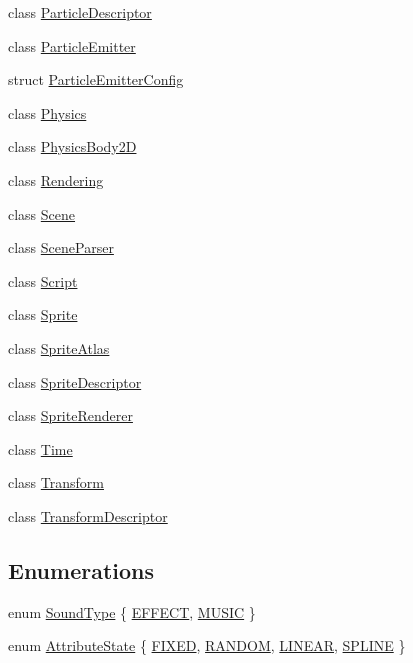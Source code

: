 \begin{DoxyCompactItemize}
class \hyperlink{class_mason_1_1_particle_descriptor}{Particle\+Descriptor}
\item 
class \hyperlink{class_mason_1_1_particle_emitter}{Particle\+Emitter}
\item 
struct \hyperlink{struct_mason_1_1_particle_emitter_config}{Particle\+Emitter\+Config}
\item 
class \hyperlink{class_mason_1_1_physics}{Physics}
\item 
class \hyperlink{class_mason_1_1_physics_body2_d}{Physics\+Body2D}
\item 
class \hyperlink{class_mason_1_1_rendering}{Rendering}
\item 
class \hyperlink{class_mason_1_1_scene}{Scene}
\item 
class \hyperlink{class_mason_1_1_scene_parser}{Scene\+Parser}
\item 
class \hyperlink{class_mason_1_1_script}{Script}
\item 
class \hyperlink{class_mason_1_1_sprite}{Sprite}
\item 
class \hyperlink{class_mason_1_1_sprite_atlas}{Sprite\+Atlas}
\item 
class \hyperlink{class_mason_1_1_sprite_descriptor}{Sprite\+Descriptor}
\item 
class \hyperlink{class_mason_1_1_sprite_renderer}{Sprite\+Renderer}
\item 
class \hyperlink{class_mason_1_1_time}{Time}
\item 
class \hyperlink{class_mason_1_1_transform}{Transform}
\item 
class \hyperlink{class_mason_1_1_transform_descriptor}{Transform\+Descriptor}
\end{DoxyCompactItemize}
\subsection*{Enumerations}
\begin{DoxyCompactItemize}
\item 
enum \hyperlink{namespace_mason_a158d651086d1ba1aacc4c37125b27657}{Sound\+Type} \{ \hyperlink{namespace_mason_a158d651086d1ba1aacc4c37125b27657a3ee843ce73fc06de504eb1480c65c82f}{E\+F\+F\+E\+CT}, 
\hyperlink{namespace_mason_a158d651086d1ba1aacc4c37125b27657aed96b5a2149aa99cd63db202531798a2}{M\+U\+S\+IC}
 \}
\item 
enum \hyperlink{namespace_mason_aefc2ce7d9295b57af46ab6c8ebfc32f7}{Attribute\+State} \{ \hyperlink{namespace_mason_aefc2ce7d9295b57af46ab6c8ebfc32f7a9f895fa38383fdd4d8ff3a0e62f6829a}{F\+I\+X\+ED}, 
\hyperlink{namespace_mason_aefc2ce7d9295b57af46ab6c8ebfc32f7a7ffd1f43455324cb476f193c685042cc}{R\+A\+N\+D\+OM}, 
\hyperlink{namespace_mason_aefc2ce7d9295b57af46ab6c8ebfc32f7adc1ccb7eb1ce06e416232c706f0b3e93}{L\+I\+N\+E\+AR}, 
\hyperlink{namespace_mason_aefc2ce7d9295b57af46ab6c8ebfc32f7a279e070d018a6126a336f0f28185ecdf}{S\+P\+L\+I\+NE}
 \}
\end{DoxyCompactItemize}


